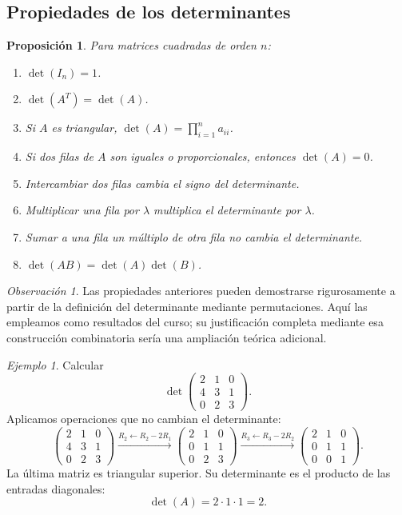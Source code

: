 \documentclass[12pt]{article}
\newtheorem{proposicion}[definicion]{Proposición}
\theoremstyle{remark}
\newtheorem{observacion}[definicion]{Observación}
\newtheorem{ejemplo}[definicion]{Ejemplo}
\begin{document}
\subsection*{Propiedades de los determinantes}
\begin{proposicion}
Para matrices cuadradas de orden $n$:
\begin{enumerate}
\item $\det(I_n)=1$.
\item $\det(A^T)=\det(A)$.
\item Si $A$ es triangular, $\det(A)=\prod_{i=1}^{n}a_{ii}$.
\item Si dos filas de $A$ son iguales o proporcionales, entonces $\det(A)=0$.
\item Intercambiar dos filas cambia el signo del determinante.
\item Multiplicar una fila por $\lambda$ multiplica el determinante por $\lambda$.
\item Sumar a una fila un múltiplo de otra fila \emph{no cambia} el determinante.
\item $\det(AB)=\det(A)\det(B)$.
\end{enumerate}
\end{proposicion}

\begin{observacion}
Las propiedades anteriores pueden demostrarse rigurosamente a partir de la definición del determinante mediante permutaciones. Aquí las empleamos como resultados del curso; su justificación completa mediante esa construcción combinatoria sería una ampliación teórica adicional.
\end{observacion}

\begin{ejemplo}
Calcular
\[
\det\begin{pmatrix}2&1&0\\4&3&1\\0&2&3\end{pmatrix}.
\]
Aplicamos operaciones que no cambian el determinante:
\[
\begin{pmatrix}2&1&0\\4&3&1\\0&2&3\end{pmatrix}
\xrightarrow{R_2\leftarrow R_2-2R_1}
\begin{pmatrix}2&1&0\\0&1&1\\0&2&3\end{pmatrix}
\xrightarrow{R_3\leftarrow R_3-2R_2}
\begin{pmatrix}2&1&0\\0&1&1\\0&0&1\end{pmatrix}.
\]
La última matriz es triangular superior. Su determinante es el producto de las entradas diagonales:
\[
\boxed{\det(A)=2\cdot1\cdot1=2}.
\]
\end{ejemplo}
\end{document}
